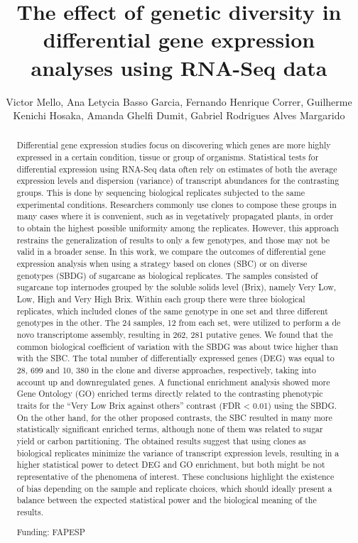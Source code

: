 \documentclass[twoside]{article}
\title{\vspace{-15mm}\fontsize{24pt}{10pt}\selectfont\textbf{ The effect of genetic diversity in differential gene expression analyses using RNA-Seq data }} %
\author{ Victor Mello, Ana Letycia Basso Garcia, Fernando Henrique Correr, Guilherme Kenichi Hosaka, Amanda Ghelfi Dumit, Gabriel Rodrigues Alves Margarido }
\affil{ ESALQ - USP }
\date{}
\begin{document}
  
  
  \maketitle %
  
  
  \thispagestyle{fancy} %
  
  
  \begin{abstract}
  Differential gene expression studies focus on discovering which genes are more highly expressed in a certain condition,  tissue or group of organisms. Statistical tests for differential expression using RNA-Seq data often rely on estimates of both the average expression levels and dispersion (variance) of transcript abundances for the contrasting groups. This is done by sequencing biological replicates subjected to the same experimental conditions. Researchers commonly use clones to compose these groups in many cases where it is convenient,  such as in vegetatively propagated plants,  in order to obtain the highest possible uniformity among the replicates. However,  this approach restrains the generalization of results to only a few genotypes,  and those may not be valid in a broader sense. In this work,  we compare the outcomes of differential gene expression analysis when using a strategy based on clones (SBC) or on diverse genotypes (SBDG) of sugarcane as biological replicates. The samples consisted of sugarcane top internodes grouped by the soluble solids level (Brix),  namely Very Low,  Low,  High and Very High Brix. Within each group there were three biological replicates,  which included clones of the same genotype in one set and three different genotypes in the other. The 24 samples,  12 from each set,  were utilized to perform a de novo transcriptome assembly,  resulting in 262, 281 putative genes. We found that the common biological coefficient of variation with the SBDG was about twice higher than with the SBC. The total number of differentially expressed genes (DEG) was equal to 28, 699 and 10, 380 in the clone and diverse approaches,  respectively,  taking into account up and downregulated genes. A functional enrichment analysis showed more Gene Ontology (GO) enriched terms directly related to the contrasting phenotypic traits for the “Very Low Brix against others” contrast (FDR < 0.01) using the SBDG. On the other hand,  for the other proposed contrasts,  the SBC resulted in many more statistically significant enriched terms,  although none of them was related to sugar yield or carbon partitioning. The obtained results suggest that using clones as biological replicates minimize the variance of transcript expression levels,  resulting in a higher statistical power to detect DEG and GO enrichment,  but both might be not representative of the phenomena of interest. These conclusions highlight the existence of bias depending on the sample and replicate choices,  which should ideally present a balance between the expected statistical power and the biological meaning of the results.
  
  Funding: FAPESP \\ 
  \end{abstract}
  
\end{document}
